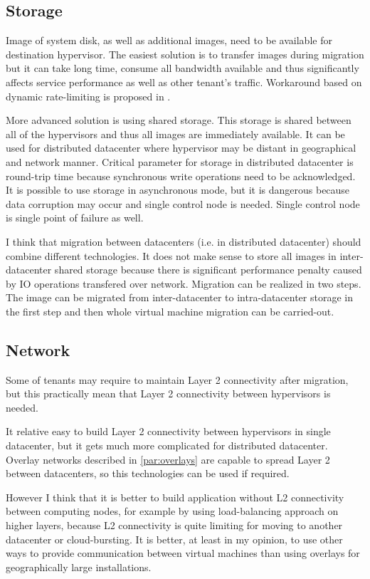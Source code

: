 \subsection{Storage}
Image of system disk, as well as additional images, need to be available for destination hypervisor. The easiest solution is to transfer images during migration but it can take long time, consume all bandwidth available and thus significantly affects service performance as well as other tenant's traffic. Workaround based on dynamic rate-limiting is proposed in \cite{live-migration-of-vms}.

More advanced solution is using shared storage. This storage is shared between all of the hypervisors and thus all images are immediately available. It can be used for distributed datacenter where hypervisor may be distant in geographical and network manner. Critical parameter for storage in distributed datacenter is round-trip time because synchronous write operations need to be acknowledged. It is possible to use storage in asynchronous mode, but it is dangerous because data corruption may occur and single control node is needed. Single control node is single point of failure as well. 

I think that migration between datacenters (i.e. in distributed datacenter) should combine different technologies. It does not make sense to store all images in inter-datacenter shared storage because there is significant performance penalty caused by \Ac{IO} operations transfered over network. Migration can be realized in two steps. The image can be migrated from inter-datacenter to intra-datacenter storage in the first step and then whole virtual machine migration can be carried-out.

\subsection{Network}
Some of tenants may require to maintain Layer 2 connectivity after migration, but this practically mean that Layer 2 connectivity between hypervisors is needed. 

It relative easy to build Layer 2 connectivity between hypervisors in single datacenter, but it gets much more complicated for distributed datacenter. Overlay networks described in \ref{par:overlays} are capable to spread Layer 2 between datacenters, so this technologies can be used if required. 

However I think that it is better to build application without L2 connectivity between computing nodes, for example by using load-balancing approach on higher layers, because L2 connectivity is quite limiting for moving to another datacenter or cloud-bursting. It is better, at least in my opinion, to use other ways to provide communication between virtual machines than using overlays for geographically large installations.

